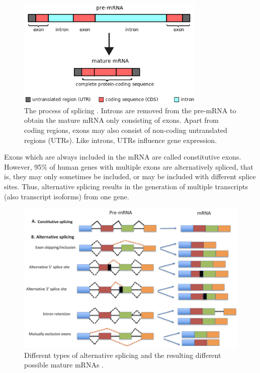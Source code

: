 \begin{figure}
	\centering\includegraphics[width=0.8\textwidth]{../visualizations/ch2-biobackground/pre-mrna2mrna.png} 
	\caption
	{The process of splicing \cite{img:mrna}. Introns are removed from the pre-mRNA to obtain the mature mRNA only consisting of exons. Apart from coding regions, exons may also consist of non-coding untranslated regions (UTRs). Like introns, UTRs influence gene expression. 
	}
	\label{fig:pre-mrna2mrna}
\end{figure}



Exons which are always included in the mRNA are called constitutive exons. However, 95\% of human genes with multiple exons are alternatively spliced, that is, they may only sometimes be included, or may be included with different splice sites. Thus, alternative splicing results in the generation of multiple transcripts (also transcript isoforms) from one gene. 

\begin{figure}[h]
	\centering\includegraphics[width=1\textwidth]{../visualizations/ch2-biobackground/alternative_splicing_forms.png} 
	\caption
	{Different types of alternative splicing and the resulting different possible mature mRNAs \cite{img:altsplicingforms}.
	}
	\label{fig:altsplicingforms}
\end{figure}

